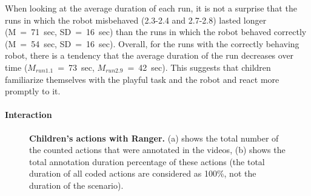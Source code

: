 \documentclass{sig-alternate}
\begin{document}
When looking at the average duration of each run, it is not a surprise that the
runs in which the robot misbehaved (2.3-2.4 and 2.7-2.8) lasted longer
(M~=~71~sec, SD~=~16~sec) than the runs in which the robot behaved correctly
(M~=~54~sec, SD~=~16~sec). Overall, for the runs with the correctly behaving
robot, there is a tendency that the average duration of the run decreases over
time ($M_{run1.1}$~=~73~sec, $M_{run2.9}$~=~42~sec). This suggests that children
familiarize themselves with the playful task and the robot and react more
promptly to it.


\paragraph{Interaction}
	 
\begin{figure}[!h]
  \centering
{}

  \caption[Total Number and Duration of Children's Actions with Ranger]{\small \textbf{Children's actions with Ranger.} (a) shows the total number of the counted actions that were annotated in the videos, (b) shows the total annotation duration percentage of these actions (the total duration of all coded actions are considered as 100\%, not the duration of the scenario).}
  \label{fig:domino-actions-pie}
\end{figure}		 
\end{document}
